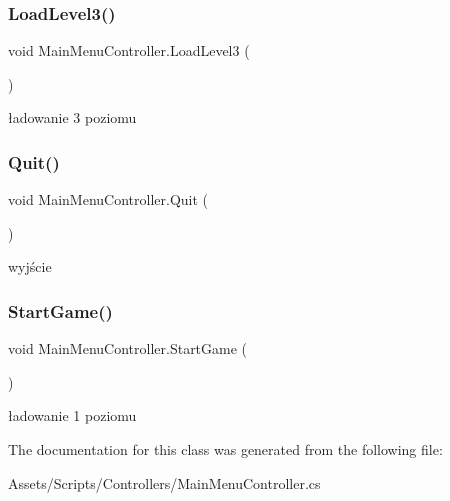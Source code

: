 \subsubsection{\texorpdfstring{Load\+Level3()}{LoadLevel3()}}
{\footnotesize\ttfamily void Main\+Menu\+Controller.\+Load\+Level3 (\begin{DoxyParamCaption}{ }\end{DoxyParamCaption})}



ładowanie 3 poziomu 

\mbox{\label{class_main_menu_controller_ad03fe2e1403dbc61cbc2838abd0091f4}} 
\subsubsection{\texorpdfstring{Quit()}{Quit()}}
{\footnotesize\ttfamily void Main\+Menu\+Controller.\+Quit (\begin{DoxyParamCaption}{ }\end{DoxyParamCaption})}



wyjście 

\mbox{\label{class_main_menu_controller_af693059f9f9b501929d35b23257f83ea}} 
\subsubsection{\texorpdfstring{Start\+Game()}{StartGame()}}
{\footnotesize\ttfamily void Main\+Menu\+Controller.\+Start\+Game (\begin{DoxyParamCaption}{ }\end{DoxyParamCaption})}



ładowanie 1 poziomu 



The documentation for this class was generated from the following file\+:\begin{DoxyCompactItemize}
\item 
Assets/\+Scripts/\+Controllers/Main\+Menu\+Controller.\+cs\end{DoxyCompactItemize}
